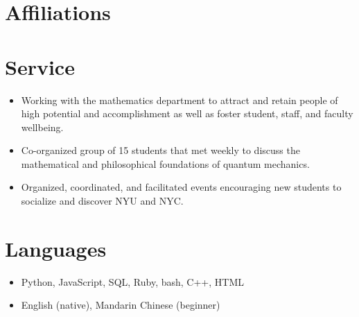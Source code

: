 \documentclass{cultvoucher}
\begin{document}

\section{Affiliations}





\section{Service}

\begin{itemize}
	\item Working with the mathematics department to attract and retain people of high potential and accomplishment as well as foster student, staff, and faculty wellbeing.
\end{itemize}

\begin{itemize}
	\item Co-organized group of 15 students that met weekly to discuss the mathematical and philosophical foundations of quantum mechanics.
\end{itemize}

\begin{itemize}
	\item Organized, coordinated, and facilitated events encouraging new students to socialize and discover NYU and NYC.
\end{itemize}

\section{Languages}
\begin{itemize}
	\item Python, JavaScript, SQL, Ruby, bash, C++, HTML
	\item English (native), Mandarin Chinese (beginner)
\end{itemize}
\end{document}
